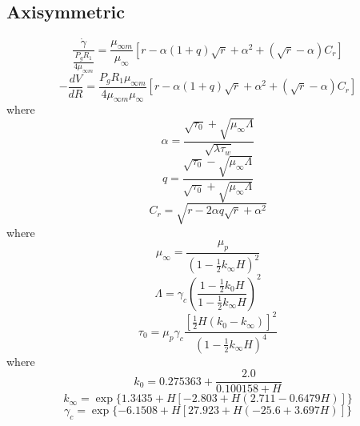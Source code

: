 \subsection{Axisymmetric}
\begin{equation}
  \frac{\dot{\gamma}}{\frac{P_g R_1}{4 \mu_{\infty m}}} = \frac{\mu_{\infty m}}
  {\mu_\infty} [r - \alpha (1 + q) \sqrt{r} + \alpha^2 + (\sqrt{r} -
  \alpha) C_r]
\end{equation}
\begin{equation}
  -\frac{dV}{dR} = \frac{P_g R_1 \mu_{\infty m}}{4 \mu_{\infty m} \mu_\infty}
  [r - \alpha (1 + q) \sqrt{r} + \alpha^2 + (\sqrt{r} - \alpha) C_r]
\end{equation}
where
\begin{equation*}
  \alpha = \frac{\sqrt{\tau_0} + \sqrt{\mu_\infty \Lambda}}
  {\sqrt{\lambda \tau_w}}
\end{equation*}
\begin{equation}
  q = \frac{\sqrt{\tau_0} - \sqrt{\mu_\infty \Lambda}}{\sqrt{\tau_0} +
  \sqrt{\mu_\infty \Lambda}}
\end{equation}
\begin{equation*}
  C_r = \sqrt{r - 2 \alpha q \sqrt{r} + \alpha^2}
\end{equation*}
where
\begin{equation*}
  \mu_\infty = \frac{\mu_p}{(1 - \frac{1}{2}k_\infty H)^2}
\end{equation*}
\begin{equation}
  \Lambda = \gamma_c \left(\frac{1 - \frac{1}{2} k_0 H}
  {1 - \frac{1}{2} k_\infty H} \right)^2
\end{equation}
\begin{equation*}
  \tau_0 = \mu_p \gamma_c \frac{\left[\frac{1}{2} H(k_0 - k_\infty) \right]^2}
  {\left(1 - \frac{1}{2} k_\infty H \right)^4}
\end{equation*}
where
\begin{equation*}
  k_0 = 0.275363 + \frac{2.0}{0.100158 + H}
\end{equation*}
\begin{equation}
  k_\infty = \exp{\{1.3435 + H[-2.803 + H(2.711 - 0.6479 H)]\}}
\end{equation}
\begin{equation*}
  \gamma_c = \exp{\{-6.1508 + H[27.923 + H(-25.6 + 3.697 H)]\}}
\end{equation*}
